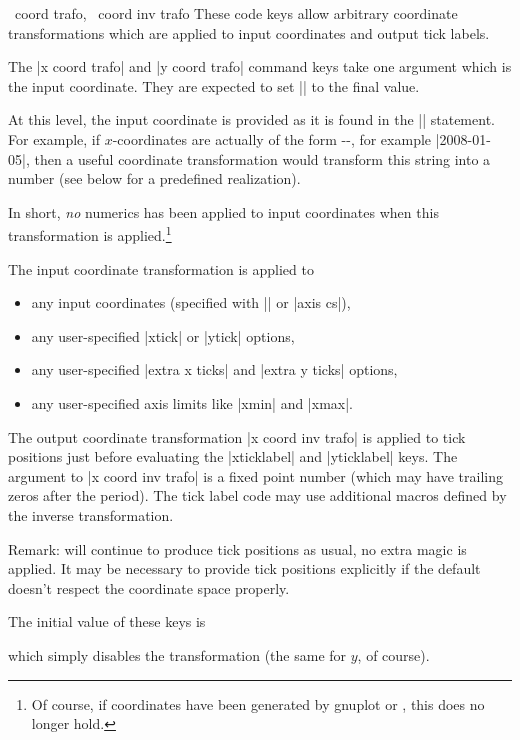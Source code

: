 \begin{pgfplotsxycodekeylist}{%
    \x\ coord trafo,
    \x\ coord inv trafo%
}
    These code keys allow arbitrary coordinate transformations which are
    applied to input coordinates and output tick labels.

    The |x coord trafo| and |y coord trafo| command keys take one argument
    which is the input coordinate. They are expected to set |\pgfmathresult| to
    the final value.

    At this level, the input coordinate is provided as it is found in the
    |\addplot| statement. For example, if $x$-coordinates are actually of the
    form --, for example |2008-01-05|, then a
    useful coordinate transformation would transform this string into a number
    (see below for a predefined realization).

    In short, \emph{no} numerics has been applied to input coordinates when
    this transformation is applied.\footnote{Of course, if coordinates have been
    generated by gnuplot or \pgfname{}, this does no longer hold.}

    The input coordinate transformation is applied to
    \begin{itemize}
        \item any input coordinates (specified with |\addplot| or |axis cs|),
        \item any user-specified |xtick| or |ytick| options,
        \item any user-specified |extra x ticks| and |extra y ticks| options,
        \item any user-specified axis limits like |xmin| and |xmax|.
    \end{itemize}

    The output coordinate transformation |x coord inv trafo| is applied to tick
    positions just before evaluating the |xticklabel| and |yticklabel| keys.
    The argument to |x coord inv trafo| is a fixed point number (which may have
    trailing zeros after the period). The tick label code may use additional
    macros defined by the inverse transformation.

    Remark: \PGFPlots{} will continue to produce tick positions as usual, no
    extra magic is applied. It may be necessary to provide tick positions
    explicitly if the default doesn't respect the coordinate space properly.

    The initial value of these keys is
\begin{codeexample}
\end{codeexample}
    \noindent which simply disables the transformation (the same for $y$, of
    course).



\end{pgfplotsxycodekeylist}
